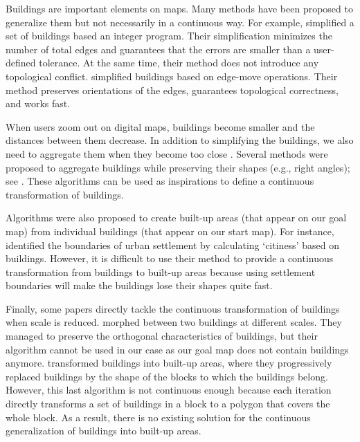 Buildings are important elements on maps. 
Many methods have been proposed to generalize them 
but not necessarily in a continuous way.
For example, \citet{Haunertwolff2010Building} simplified a set 
of buildings based an integer program.
Their simplification minimizes the number of total edges and 
guarantees that the errors are smaller than 
a user-defined tolerance.
At the same time, their method does not introduce any topological conflict.
\citet{Buchin2011_Simp} simplified buildings based on 
edge-move operations.
Their method preserves orientations of the edges,
guarantees topological correctness, and works fast.


When users zoom out on digital maps, 
buildings become smaller and 
the distances between them decrease. 
In addition to simplifying the buildings,
we also need to aggregate them when 
they become too close \cite{Weibel1997}. 
Several methods were proposed 
to aggregate buildings while preserving their shapes 
(e.g., right angles);
see \citet{Regnauld2001,RegnauldRevell07,Damen2008}. 
These algorithms can be used as inspirations 
to define a continuous transformation of buildings.

Algorithms were also proposed to create 
built-up areas (that appear on our goal map) from 
individual buildings (that appear on our start map). 
For instance, \citet{Chaudhry2008} identified 
the boundaries of urban settlement 
by calculating `citiness' based on buildings. 
However, it is difficult to use their method 
to provide a continuous transformation 
from buildings to built-up areas
because using settlement boundaries will 
make the buildings lose their shapes quite fast.

Finally, some papers directly tackle 
the continuous transformation of buildings 
when scale is reduced. 
\citet{Li2017_Building} morphed between two buildings 
at different scales.
They managed to preserve the orthogonal characteristics of 
buildings, but their algorithm cannot be used in our case 
as our goal map does not contain buildings anymore.
\citet{Touya2017Progressive} 
transformed buildings into built-up areas, 
where they progressively replaced buildings 
by the shape of the blocks to which the buildings belong. 
However, this last algorithm is not continuous enough 
because each iteration directly transforms 
a set of buildings in a block to a polygon 
that covers the whole block. 
As a result, there is no existing solution 
for the continuous generalization of buildings 
into built-up areas.


